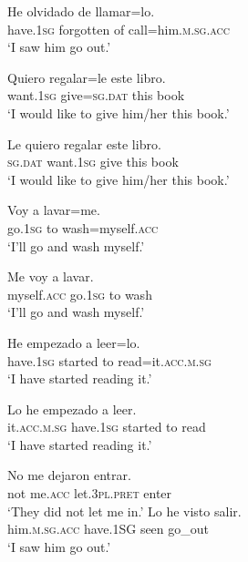 \documentclass[output=paper,modfonts,nonflat,newtxmath]{langsci/langscibook}
\begin{document}
\ea \label{ex:sciutti:22}
    \gll He olvidado de llamar=lo.\\
         have.\textsc{1sg} forgotten of call=him.\textsc{m.sg.acc} \\
    \glt  ‘I saw him go out.’
\ex \label{ex:sciutti:23}
    \begin{xlist}
    \ex \label{ex:sciutti:23a}
    \gll Quiero regalar=le este libro.\\
         want.\textsc{1sg} give=\textsc{sg.dat} this  book\\
    \glt  ‘I would like to give him/her this book.’

    \ex \label{ex:sciutti:23b}
    \gll Le quiero regalar este libro.\\
         \textsc{sg.dat} want.\textsc{1sg} give this book\\
    \glt  ‘I would like to give him/her this book.’
    \end{xlist}
\ex \label{ex:sciutti:24}
    \begin{xlist}
    \ex \label{ex:sciutti:24a}
    \gll Voy a lavar=me.\\
         go.\textsc{1sg} to wash=myself.\textsc{acc}\\
    \glt  ‘I’ll go and wash myself.’

    \ex \label{ex:sciutti:24b}
    \gll Me voy a lavar.\\
         myself.\textsc{acc} go.\textsc{1sg} to wash\\
    \glt  ‘I’ll go and wash myself.’
    \end{xlist}
\ex \label{ex:sciutti:25}
    \begin{xlist}
    \ex \label{ex:sciutti:25a}
    \gll He empezado a leer=lo.\\
         have.\textsc{1sg} started to read=it.\textsc{acc.m.sg}\\
    \glt  ‘I have started reading it.’

    \ex \label{ex:sciutti:25b}
    \gll Lo he empezado a leer.\\
         it.\textsc{acc.m.sg} have.\textsc{1sg} started to read\\
    \glt  ‘I have started reading it.’
    \end{xlist}
\ex \label{ex:sciutti:26}
    \gll No me dejaron entrar.\\
         not me.\textsc{acc} let.\textsc{3pl.pret} enter \\
    \glt  ‘They did not let me in.’
\ex \label{ex:sciutti:27}
    \gll Lo he visto salir.\\
         him.\textsc{m.sg.acc} have.{1SG} seen go\_out \\
    \glt  ‘I saw him go out.’
\z
\end{document}
